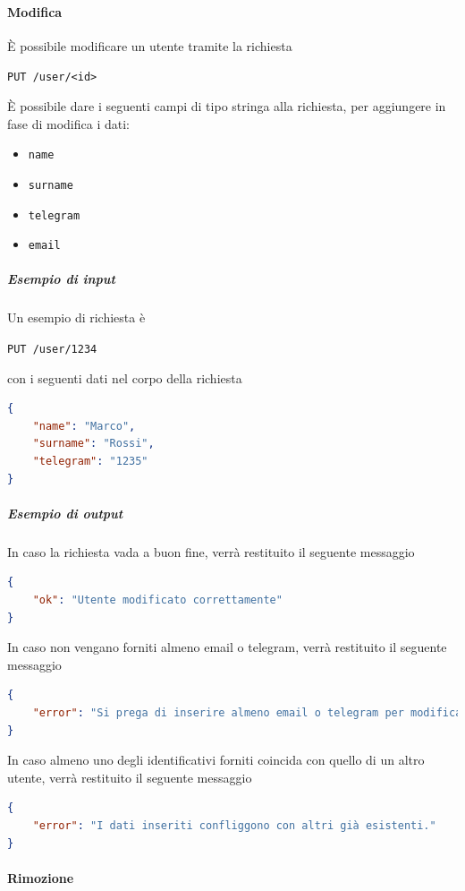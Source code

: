 \paragraph{Modifica}

È possibile modificare un utente tramite la richiesta
\begin{center}
    \texttt{PUT /user/<id>}
\end{center}

È possibile dare i seguenti campi di tipo stringa alla richiesta, per aggiungere in fase di modifica i dati:
\begin{itemize}[noitemsep]
    \item \texttt{name}
    \item \texttt{surname}
    \item \texttt{telegram}
    \item \texttt{email}
\end{itemize}

    \subparagraph{Esempio di input}
    Un esempio di richiesta è
    \begin{center}
	    \texttt{PUT /user/1234}
    \end{center}
    con i seguenti dati nel corpo della richiesta
	\begin{lstlisting}[language = json]
{
    "name": "Marco",
    "surname": "Rossi",
    "telegram": "1235"
}
    \end{lstlisting}

    \subparagraph{Esempio di output}
    In caso la richiesta vada a buon fine, verrà restituito il seguente messaggio
	\begin{lstlisting}[language = json]
{
    "ok": "Utente modificato correttamente"
}
	\end{lstlisting}

	In caso non vengano forniti almeno email o telegram, verrà restituito il seguente messaggio
	\begin{lstlisting}[language = json]
{
    "error": "Si prega di inserire almeno email o telegram per modificare l'utente."
}
	\end{lstlisting}

	In caso almeno uno degli identificativi forniti coincida con quello di un altro utente, verrà restituito il seguente messaggio
	\begin{lstlisting}[language = json]
{
    "error": "I dati inseriti confliggono con altri già esistenti."
}
	\end{lstlisting}

\paragraph{Rimozione}

